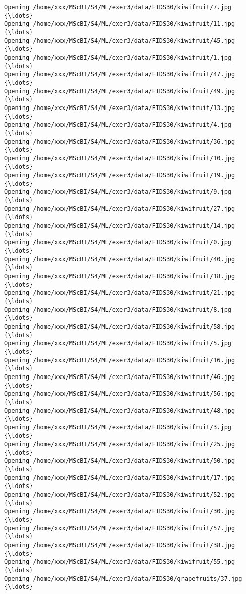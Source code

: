 \documentclass[11pt]{article}
\begin{document}
\begin{Verbatim}[commandchars=\\\{\}]
Opening /home/xxx/MScBI/S4/ML/exer3/data/FIDS30/kiwifruit/7.jpg  {\ldots}
Opening /home/xxx/MScBI/S4/ML/exer3/data/FIDS30/kiwifruit/11.jpg  {\ldots}
Opening /home/xxx/MScBI/S4/ML/exer3/data/FIDS30/kiwifruit/45.jpg  {\ldots}
Opening /home/xxx/MScBI/S4/ML/exer3/data/FIDS30/kiwifruit/1.jpg  {\ldots}
Opening /home/xxx/MScBI/S4/ML/exer3/data/FIDS30/kiwifruit/47.jpg  {\ldots}
Opening /home/xxx/MScBI/S4/ML/exer3/data/FIDS30/kiwifruit/49.jpg  {\ldots}
Opening /home/xxx/MScBI/S4/ML/exer3/data/FIDS30/kiwifruit/13.jpg  {\ldots}
Opening /home/xxx/MScBI/S4/ML/exer3/data/FIDS30/kiwifruit/4.jpg  {\ldots}
Opening /home/xxx/MScBI/S4/ML/exer3/data/FIDS30/kiwifruit/36.jpg  {\ldots}
Opening /home/xxx/MScBI/S4/ML/exer3/data/FIDS30/kiwifruit/10.jpg  {\ldots}
Opening /home/xxx/MScBI/S4/ML/exer3/data/FIDS30/kiwifruit/19.jpg  {\ldots}
Opening /home/xxx/MScBI/S4/ML/exer3/data/FIDS30/kiwifruit/9.jpg  {\ldots}
Opening /home/xxx/MScBI/S4/ML/exer3/data/FIDS30/kiwifruit/27.jpg  {\ldots}
Opening /home/xxx/MScBI/S4/ML/exer3/data/FIDS30/kiwifruit/14.jpg  {\ldots}
Opening /home/xxx/MScBI/S4/ML/exer3/data/FIDS30/kiwifruit/0.jpg  {\ldots}
Opening /home/xxx/MScBI/S4/ML/exer3/data/FIDS30/kiwifruit/40.jpg  {\ldots}
Opening /home/xxx/MScBI/S4/ML/exer3/data/FIDS30/kiwifruit/18.jpg  {\ldots}
Opening /home/xxx/MScBI/S4/ML/exer3/data/FIDS30/kiwifruit/21.jpg  {\ldots}
Opening /home/xxx/MScBI/S4/ML/exer3/data/FIDS30/kiwifruit/8.jpg  {\ldots}
Opening /home/xxx/MScBI/S4/ML/exer3/data/FIDS30/kiwifruit/58.jpg  {\ldots}
Opening /home/xxx/MScBI/S4/ML/exer3/data/FIDS30/kiwifruit/5.jpg  {\ldots}
Opening /home/xxx/MScBI/S4/ML/exer3/data/FIDS30/kiwifruit/16.jpg  {\ldots}
Opening /home/xxx/MScBI/S4/ML/exer3/data/FIDS30/kiwifruit/46.jpg  {\ldots}
Opening /home/xxx/MScBI/S4/ML/exer3/data/FIDS30/kiwifruit/56.jpg  {\ldots}
Opening /home/xxx/MScBI/S4/ML/exer3/data/FIDS30/kiwifruit/48.jpg  {\ldots}
Opening /home/xxx/MScBI/S4/ML/exer3/data/FIDS30/kiwifruit/3.jpg  {\ldots}
Opening /home/xxx/MScBI/S4/ML/exer3/data/FIDS30/kiwifruit/25.jpg  {\ldots}
Opening /home/xxx/MScBI/S4/ML/exer3/data/FIDS30/kiwifruit/50.jpg  {\ldots}
Opening /home/xxx/MScBI/S4/ML/exer3/data/FIDS30/kiwifruit/17.jpg  {\ldots}
Opening /home/xxx/MScBI/S4/ML/exer3/data/FIDS30/kiwifruit/52.jpg  {\ldots}
Opening /home/xxx/MScBI/S4/ML/exer3/data/FIDS30/kiwifruit/30.jpg  {\ldots}
Opening /home/xxx/MScBI/S4/ML/exer3/data/FIDS30/kiwifruit/57.jpg  {\ldots}
Opening /home/xxx/MScBI/S4/ML/exer3/data/FIDS30/kiwifruit/38.jpg  {\ldots}
Opening /home/xxx/MScBI/S4/ML/exer3/data/FIDS30/kiwifruit/55.jpg  {\ldots}
Opening /home/xxx/MScBI/S4/ML/exer3/data/FIDS30/grapefruits/37.jpg  {\ldots}

\end{Verbatim}
\end{document}
